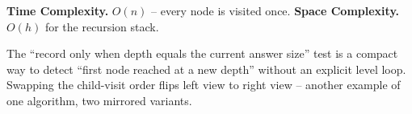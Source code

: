 \begin{complexitybox}
\textbf{Time Complexity.} $O(n)$ -- every node is visited once.
\textbf{Space Complexity.} $O(h)$ for the recursion stack.
\end{complexitybox}

\begin{takeawaybox}
The ``record only when depth equals the current answer size'' test is a
compact way to detect ``first node reached at a new depth'' without an
explicit level loop. Swapping the child-visit order flips left view to
right view -- another example of one algorithm, two mirrored variants.
\end{takeawaybox}

